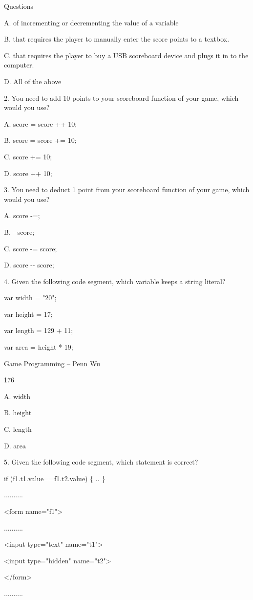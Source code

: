 \documentclass[
]{article}
\begin{document}
Questions

A. of incrementing or decrementing the value of a variable

B. that requires the player to manually enter the score points to a
textbox.

C. that requires the player to buy a USB scoreboard device and plugs it
in to the computer.

D. All of the above

2. You need to add 10 points to your scoreboard function of your game,
which would you use?

A. score = score ++ 10;

B. score = score += 10;

C. score += 10;

D. score ++ 10;

3. You need to deduct 1 point from your scoreboard function of your
game, which would you use?

A. score -=;

B. -\/-score;

C. score -= score;

D. score -\/- score;

4. Given the following code segment, which variable keeps a string
literal?

var width = "20";

var height = 17;

var length = 129 + 11;

var area = height * 19;

Game Programming -- Penn Wu

176

\protect\hypertarget{index_split_011.htmlux5cux23p177}{}{}A. width

B. height

C. length

D. area

5. Given the following code segment, which statement is correct?

if (f1.t1.value==f1.t2.value) \{ .. \}

..........

\textless form name="f1"\textgreater{}

..........

\textless input type="text" name="t1"\textgreater{}

\textless input type="hidden" name="t2"\textgreater{}

\textless/form\textgreater{}

..........
\end{document}
